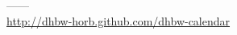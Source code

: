 \documentclass{beamer}
\begin{document}

\begin{frame}
\begin{center}
  \huge ------ \\
  \url{http://dhbw-horb.github.com/dhbw-calendar}
\end{center}
\end{frame}

\end{document}

